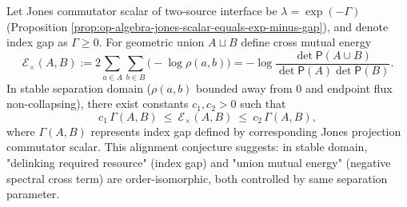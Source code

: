 \begin{conjecture}\label{conj:xi-energy-index-gap-comparability}
Let Jones commutator scalar of two-source interface be \(\lambda=\exp(-\Gamma)\) (Proposition \ref{prop:op-algebra-jones-scalar-equals-exp-minus-gap}), and denote index gap as \(\Gamma\ge 0\).
For geometric union \(A\sqcup B\) define cross mutual energy
\[
\mathcal{E}_{\times}(A,B):=2\sum_{a\in A}\sum_{b\in B}\bigl(-\log\rho(a,b)\bigr)
=-\log\frac{\det\mathsf P(A\cup B)}{\det\mathsf P(A)\det\mathsf P(B)}.
\]
In stable separation domain (\(\rho(a,b)\) bounded away from \(0\) and endpoint flux non-collapsing), there exist constants \(c_1,c_2>0\) such that
\[
\boxed{\;
c_1\,\Gamma(A,B)\ \le\ \mathcal{E}_{\times}(A,B)\ \le\ c_2\,\Gamma(A,B),\;}
\]
where \(\Gamma(A,B)\) represents index gap defined by corresponding Jones projection commutator scalar.
This alignment conjecture suggests: in stable domain, "delinking required resource" (index gap) and "union mutual energy" (negative spectral cross term) are order-isomorphic, both controlled by same separation parameter.
\end{conjecture}



\endinput




